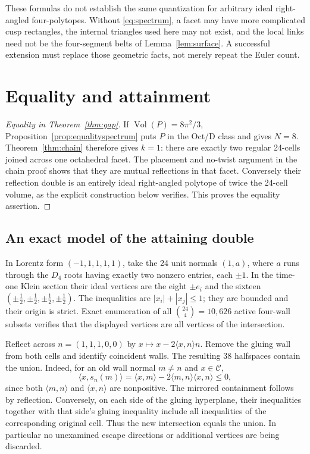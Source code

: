 \documentclass[11pt]{article}
\theoremstyle{remark}
\newcommand{\Vol}{\operatorname{Vol}}
\newcommand{\ip}[2]{\langle #1,#2\rangle}
\newcommand{\CELL}{\mathcal C}
\begin{document}
These formulas do not establish the same quantization for arbitrary
ideal right-angled four-polytopes. Without
\eqref{eq:spectrum}, a facet may have more complicated cusp
rectangles, the internal triangles used here may not exist, and
the local links need not be the four-segment belts of
Lemma~\ref{lem:surface}. A successful extension must replace those
geometric facts, not merely repeat the Euler count.

\section{Equality and attainment}\label{sec:attainment}
\begin{proof}[Equality in Theorem~\ref{thm:gap}]
If $\Vol(P)=8\pi^2/3$, Proposition~\ref{prop:equalityspectrum}
puts $P$ in the Oct/D class and gives $N=8$. Theorem~\ref{thm:chain}
therefore gives $k=1$: there are exactly two regular 24-cells joined
across one octahedral facet. The placement and no-twist argument in
the chain proof shows that they are mutual reflections in that
facet. Conversely their reflection double is an entirely ideal
right-angled polytope of twice the 24-cell volume, as the explicit
construction below verifies. This proves the equality assertion.
\end{proof}

\subsection{An exact model of the attaining double}

In Lorentz form $(-1,1,1,1,1)$, take the 24 unit normals $(1,a)$,
where $a$ runs through the $D_4$ roots having exactly two nonzero
entries, each $\pm1$. In the time-one Klein section their ideal
vertices are the eight $\pm e_i$ and the sixteen
$(\pm\tfrac12,\pm\tfrac12,\pm\tfrac12,\pm\tfrac12)$.
The inequalities are $|x_i|+|x_j|\le1$; they are bounded and their
origin is strict. Exact enumeration of all $\binom{24}{4}=10,626$
active four-wall subsets verifies that the displayed vertices are all
vertices of the intersection.

Reflect across $n=(1,1,1,0,0)$ by
$x\mapsto x-2\ip{x}{n}n$. Remove the gluing wall from both cells
and identify coincident walls. The resulting 38 halfspaces contain
the union. Indeed, for an old wall normal $m\ne n$ and $x\in\CELL$,
\[
 \ip{x}{s_n(m)}=\ip{x}{m}-2\ip{m}{n}\ip{x}{n}\le0,
\]
since both $\ip{m}{n}$ and $\ip{x}{n}$ are nonpositive. The
mirrored containment follows by reflection. Conversely, on each side of the gluing hyperplane, their
inequalities together with that side's gluing inequality include all
inequalities of the corresponding original cell. Thus the new
intersection equals the union. In particular no unexamined escape
directions or additional vertices are being discarded.
\end{document}

